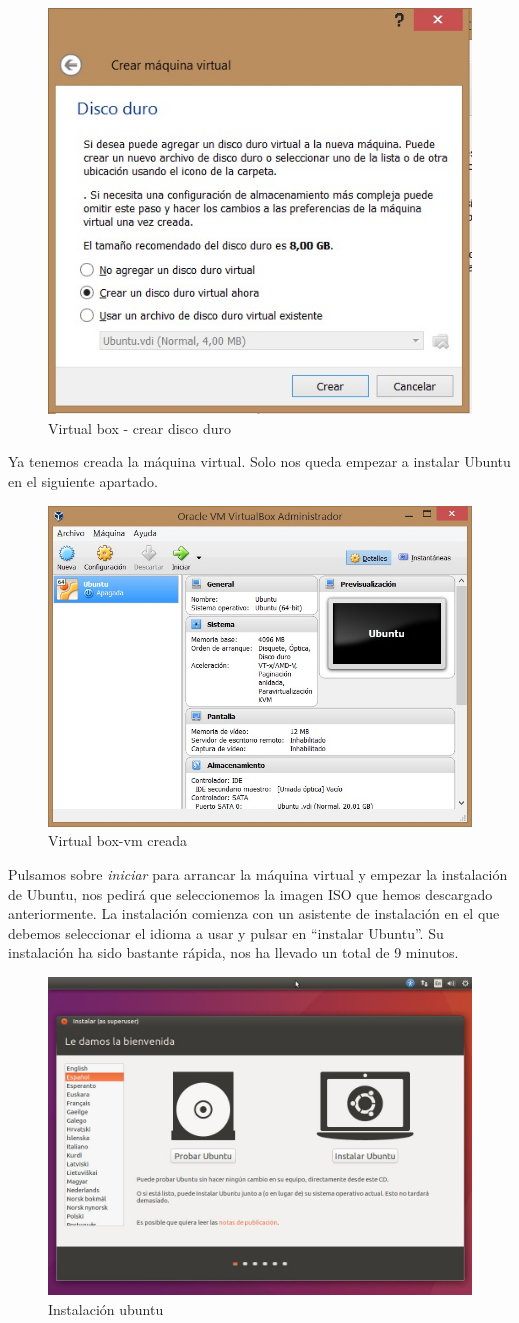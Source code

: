 \begin{figure}[H]
	\centering
	\includegraphics[width=0.5\linewidth]{figuras/vm-2}
	\caption{Virtual box - crear disco duro}
	\label{fig:vm2}
\end{figure}

Ya tenemos creada la máquina virtual. Solo nos queda empezar a instalar Ubuntu en el siguiente apartado.

\begin{figure}[H]
	\centering
	\includegraphics[width=0.6\linewidth]{figuras/vm-3}
	\caption{Virtual box-vm creada}
	\label{fig:vm3}
\end{figure}

Pulsamos sobre \textit{iniciar} para arrancar la máquina virtual y empezar la instalación de Ubuntu, nos pedirá que seleccionemos la imagen ISO que hemos descargado anteriormente. La instalación comienza con un asistente de instalación en el que debemos seleccionar el idioma a usar y pulsar en “instalar Ubuntu”. Su instalación ha sido bastante rápida, nos ha llevado un total de 9 minutos.

\begin{figure}[H]
	\centering
	\includegraphics[width=0.7\linewidth]{figuras/vm-4}
	\caption{Instalación ubuntu}
	\label{fig:vm4}
\end{figure}

